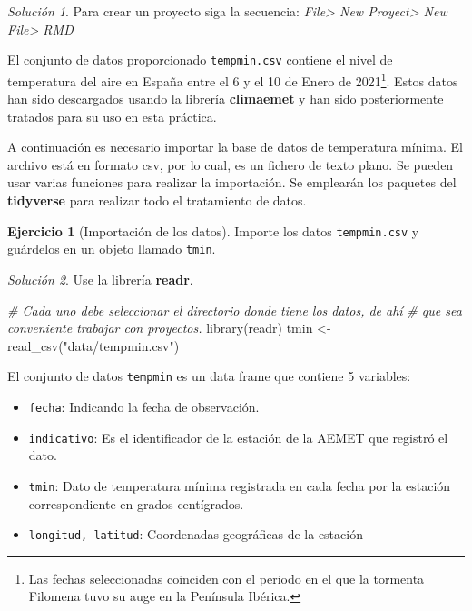 \documentclass[
]{report}
\newenvironment{Shaded}{\begin{snugshade}}{\end{snugshade}}
\newcommand{\CommentTok}[1]{\textcolor[rgb]{0.56,0.35,0.01}{\textit{#1}}}
\newcommand{\FunctionTok}[1]{\textcolor[rgb]{0.00,0.00,0.00}{#1}}
\newcommand{\NormalTok}[1]{#1}
\newcommand{\OtherTok}[1]{\textcolor[rgb]{0.56,0.35,0.01}{#1}}
\newcommand{\StringTok}[1]{\textcolor[rgb]{0.31,0.60,0.02}{#1}}
\theoremstyle{definition}
\theoremstyle{definition}
\theoremstyle{definition}
\newtheorem{exercise}{Ejercicio}[chapter]
\theoremstyle{definition}
\theoremstyle{remark}
\newtheorem*{solution}{Solución}
\begin{document}
\begin{solution}
Para crear un proyecto siga la secuencia: \emph{File\textgreater{} New Proyect\textgreater{} New File\textgreater{} RMD}
\end{solution}

El conjunto de datos proporcionado \texttt{tempmin.csv} contiene el nivel de
temperatura del aire en España entre el 6 y el 10 de Enero de
2021\footnote{Las fechas seleccionadas coinciden con el periodo en el
  que la tormenta Filomena tuvo su auge en la Península Ibérica.}. Estos datos han sido descargados usando la librería
\textbf{climaemet} \citep{R-climaemet} y han sido posteriormente tratados para su uso en
esta práctica.

A continuación es necesario importar la base de datos de temperatura mínima. El
archivo está en formato csv, por lo cual, es un fichero de texto plano. Se
pueden usar varias funciones para realizar la importación. Se emplearán los
paquetes del \textbf{tidyverse} \citep{R-tidyverse} para realizar todo el tratamiento de
datos.

\begin{exercise}[Importación de los datos]
\protect\hypertarget{exr:ex2}{}\label{exr:ex2}Importe los datos \texttt{tempmin.csv} y guárdelos en un objeto llamado \texttt{tmin}.
\end{exercise}

\begin{solution}
Use la librería \textbf{readr}.
\end{solution}

\begin{Shaded}
\begin{Highlighting}[]
\CommentTok{\# Cada uno debe seleccionar el directorio donde tiene los datos, de ahí}
\CommentTok{\# que sea conveniente trabajar con proyectos.}
\FunctionTok{library}\NormalTok{(readr)}
\NormalTok{tmin }\OtherTok{\textless{}{-}} \FunctionTok{read\_csv}\NormalTok{(}\StringTok{"data/tempmin.csv"}\NormalTok{)}
\end{Highlighting}
\end{Shaded}

El conjunto de datos \texttt{tempmin} es un data frame que contiene 5 variables:

\begin{itemize}
\item
  \texttt{fecha}: Indicando la fecha de observación.
\item
  \texttt{indicativo}: Es el identificador de la estación de la AEMET que registró el
  dato.
\item
  \texttt{tmin}: Dato de temperatura mínima registrada en cada fecha por la estación
  correspondiente en grados centígrados.
\item
  \texttt{longitud,\ latitud}: Coordenadas geográficas de la estación
\end{itemize}
\end{document}
